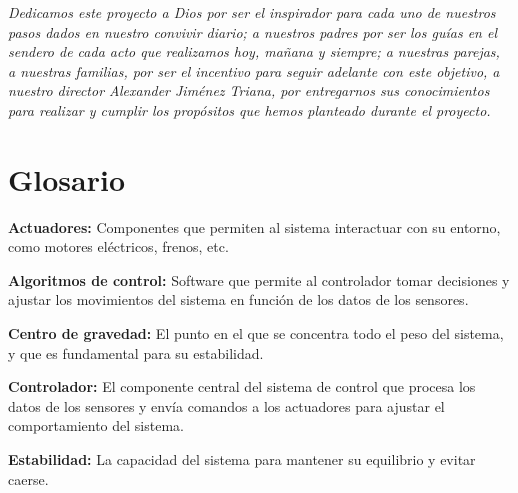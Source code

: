 \documentclass[12pt,letterpaper]{report}
\begin{document}
\textit{Dedicamos este proyecto a Dios por ser el inspirador para cada uno de nuestros pasos dados en nuestro convivir diario; a nuestros padres por ser los guías en el sendero de cada acto que realizamos hoy, mañana y siempre; a nuestras parejas, a nuestras familias, por ser el incentivo para seguir adelante con este objetivo, a nuestro director Alexander Jiménez Triana, por entregarnos sus conocimientos para realizar y cumplir los propósitos que hemos planteado durante el proyecto.}

\newpage
\tableofcontents

\newpage
\listoffigures

\newpage
\listoftables

\newpage
\chapter*{Glosario}

\vspace{2pt}
\noindent\textbf{Actuadores:} Componentes que permiten al sistema interactuar con su entorno, como motores eléctricos, frenos, etc.

\vspace{2pt}
\noindent\textbf{Algoritmos de control:} Software que permite al controlador tomar decisiones y ajustar los movimientos del sistema en función de los datos de los sensores.

\vspace{2pt}
\noindent\textbf{Centro de gravedad:} El punto en el que se concentra todo el peso del sistema, y que es fundamental para su estabilidad.

\vspace{2pt}
\noindent\textbf{Controlador:} El componente central del sistema de control que procesa los datos de los sensores y envía comandos a los actuadores para ajustar el comportamiento del sistema.

\vspace{2pt}
\noindent\textbf{Estabilidad:} La capacidad del sistema para mantener su equilibrio y evitar caerse.
\end{document}
